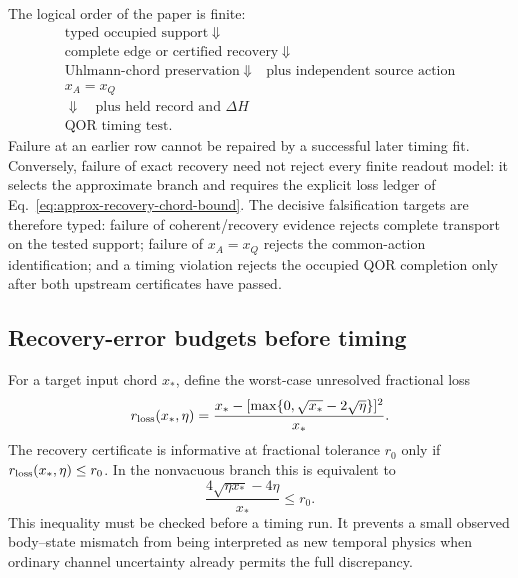 \documentclass[11pt]{article}
\begin{document}
The logical order of the paper is finite:
\begin{equation}
 \boxed{
 \begin{array}{c}
 \text{typed occupied support}\
 \Downarrow\\
 \text{complete edge or certified recovery}\
 \Downarrow\\
 \text{Uhlmann-chord preservation}\
 \Downarrow\quad\text{plus independent source action}\\
 x_A=x_Q\\
 \Downarrow\quad\text{plus held record and }\Delta H\\
 \text{QOR timing test}.
 \end{array}}
 \label{eq:dependency-spine}
\end{equation}
Failure at an earlier row cannot be repaired by a successful later timing
fit.  Conversely, failure of exact recovery need not reject every finite
readout model: it selects the approximate branch and requires the explicit
loss ledger of Eq.~\eqref{eq:approx-recovery-chord-bound}.  The decisive
falsification targets are therefore typed: failure of coherent/recovery
evidence rejects complete transport on the tested support; failure of
\(x_A=x_Q\) rejects the common-action identification; and a timing violation
rejects the occupied QOR completion only after both upstream certificates
have passed.

\subsection{Recovery-error budgets before timing}

For a target input chord \(x_*\), define the worst-case unresolved fractional
loss
\begin{equation}
 r_{\rm loss}(x_*,\eta)
 =\frac{x_*-[\max\{0,\sqrt{x_*}-2\sqrt\eta\}]^2}{x_*}.
 \label{eq:fractional-loss-budget}
\end{equation}
The recovery certificate is informative at fractional tolerance \(r_0\) only
if \(r_{\rm loss}(x_*,\eta)\leq r_0\).  In the nonvacuous branch this is
equivalent to
\begin{equation}
 \frac{4\sqrt{\eta x_*}-4\eta}{x_*}\leq r_0.
 \label{eq:recovery-budget-gate}
\end{equation}
This inequality must be checked before a timing run.  It prevents a small
observed body--state mismatch from being interpreted as new temporal physics
when ordinary channel uncertainty already permits the full discrepancy.
\end{document}
